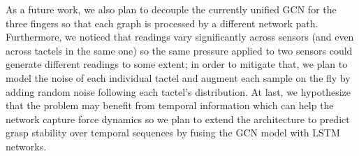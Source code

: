 As a future work, we also plan to decouple the currently unified \ac{GCN} for the three fingers so that each graph is processed by a different network path. Furthermore, we noticed that readings vary significantly across sensors (and even across tactels in the same one) so the same pressure applied to two sensors could generate different readings to some extent; in order to mitigate that, we plan to model the noise of each individual tactel and augment each sample on the fly by adding random noise following each tactel's distribution. At last, we hypothesize that the problem may benefit from temporal information which can help the network capture force dynamics so we plan to extend the architecture to predict grasp stability over temporal sequences by fusing the \ac{GCN} model with \ac{LSTM} networks. 